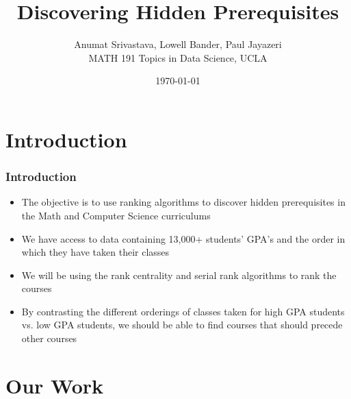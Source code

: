 \documentclass{beamer}
\title{Discovering Hidden Prerequisites}
\author{ Anumat Srivastava, Lowell Bander, Paul Jayazeri\\
\vspace{5mm}
MATH 191 Topics in Data Science, UCLA}
\date{ \today}
\begin{document}
\newtheorem{theo}{Theorem}
\newtheorem{lem}{Lemma}
\newtheorem{defin}{Definition}
\newtheorem{prop}{Proposition}
\newtheorem{ex}{Example}
\newtheorem{alg}{Algorithm}
\newtheorem{cor}{Corollary}
\newtheorem{case}{Case}


\begin{frame}
  \titlepage
\end{frame}



\section{Introduction}

\begin{frame}
     \frametitle{Introduction}
\begin{itemize}
\item The objective is to use ranking algorithms to discover hidden prerequisites in the Math and Computer Science curriculums 
\item  We have access to data containing 13,000+ students' GPA's and the order in which they have taken their classes
\item  We will be using the rank centrality and serial rank algorithms to rank the courses
\item By contrasting the different orderings of classes taken for high GPA students vs. low GPA students, we should be able to find courses that should precede other courses
\end{itemize}
\end{frame}



\section{Our Work}
\end{document}
